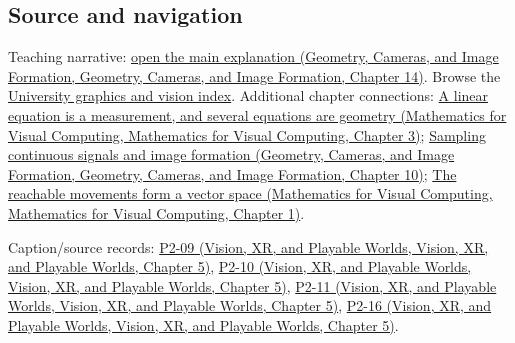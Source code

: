 \subsection{Source and navigation}\label{appendix-b0732b22e7d6-source-and-navigation}

Teaching narrative: \href{../03-Geometry-Cameras-and-Image-Formation/main.pdf\#nameddest=04-visual-computing-ii-ch033-additive-structure-explains-repeated-coincidences}{open the main explanation (Geometry, Cameras, and Image Formation, Geometry, Cameras, and Image Formation, Chapter 14)}. Browse the \hyperref[appendix-a6d556a4ef50-university-graphics-vision-and-photography---independent-series]{University graphics and vision index}. Additional chapter connections: \href{../02-Mathematics-for-Visual-Computing/main.pdf\#nameddest=01-foundations-i-ch019-a-linear-equation-is-a-measurement-and-several-equations-are-geometry}{A linear equation is a measurement, and several equations are geometry (Mathematics for Visual Computing, Mathematics for Visual Computing, Chapter 3)}; \href{../03-Geometry-Cameras-and-Image-Formation/main.pdf\#nameddest=03-visual-computing-i-ch003-sampling-continuous-signals-and-image-formation}{Sampling continuous signals and image formation (Geometry, Cameras, and Image Formation, Geometry, Cameras, and Image Formation, Chapter 10)}; \href{../02-Mathematics-for-Visual-Computing/main.pdf\#nameddest=01-foundations-i-ch017-the-reachable-movements-form-a-vector-space}{The reachable movements form a vector space (Mathematics for Visual Computing, Mathematics for Visual Computing, Chapter 1)}.

Caption/source records: \href{../07-Vision-XR-and-Playable-Worlds/main.pdf\#nameddest=04-visual-computing-ii-ch036-p2-09---lecture-09-reflections-on-the-szemeredi-trotter-theorem}{P2-09 (Vision, XR, and Playable Worlds, Vision, XR, and Playable Worlds, Chapter 5)}, \href{../07-Vision-XR-and-Playable-Worlds/main.pdf\#nameddest=04-visual-computing-ii-ch036-p2-10---lecture-10-sum-product-theory}{P2-10 (Vision, XR, and Playable Worlds, Vision, XR, and Playable Worlds, Chapter 5)}, \href{../07-Vision-XR-and-Playable-Worlds/main.pdf\#nameddest=04-visual-computing-ii-ch036-p2-11---lecture-11-contagious-structure-in-projection-theory}{P2-11 (Vision, XR, and Playable Worlds, Vision, XR, and Playable Worlds, Chapter 5)}, \href{../07-Vision-XR-and-Playable-Worlds/main.pdf\#nameddest=04-visual-computing-ii-ch036-p2-16---lecture-16-the-bourgain-projection-theorem-part-3}{P2-16 (Vision, XR, and Playable Worlds, Vision, XR, and Playable Worlds, Chapter 5)}.
